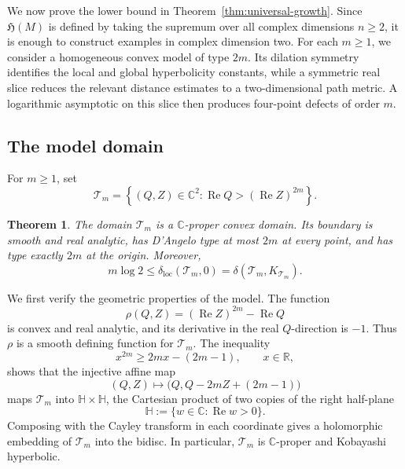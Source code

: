 \documentclass[11pt]{article}
\newtheorem{theorem}{Theorem}[section]
\theoremstyle{definition}
\begin{document}
We now prove the lower bound in Theorem~\ref{thm:universal-growth}. Since
$\mathfrak H(M)$ is defined by taking the supremum over all complex dimensions
$n\geq2$, it is enough to construct examples in complex dimension two. For
each $m\geq1$, we consider a homogeneous convex model of type $2m$. Its
dilation symmetry identifies the local and global hyperbolicity constants,
while a symmetric real slice reduces the relevant distance estimates to a
two-dimensional path metric. A logarithmic asymptotic on this slice then
produces four-point defects of order $m$.

\subsection{The model domain}\label{subsec:lb-final-models}

For $m\geq1$, set
\begin{equation}\label{eq:lb-final-model}
 \mathcal T_m
 =
 \left\{(Q,Z)\in\mathbb C^2:
 \operatorname{Re}Q>(\operatorname{Re}Z)^{2m}\right\}.
\end{equation}

\begin{theorem}\label{thm:lb-final-model}
The domain $\mathcal T_m$ is a $\mathbb C$-proper convex domain. Its boundary
is smooth and real analytic, has D'Angelo type at most $2m$ at every point,
and has type exactly $2m$ at the origin. Moreover,
\begin{equation}\label{eq:lb-final-lower}
 m\log2\leq \delta_{\mathrm{loc}}(\mathcal T_m,0)
 =
 \delta(\mathcal T_m,K_{\mathcal T_m}).
\end{equation}
\end{theorem}

We first verify the geometric properties of the model. The function
\[
 \rho(Q,Z)=(\operatorname{Re}Z)^{2m}-\operatorname{Re}Q
\]
is convex and real analytic, and its derivative in the real $Q$-direction is
$-1$. Thus $\rho$ is a smooth defining function for $\mathcal T_m$. The
inequality
\[
 x^{2m}\geq2mx-(2m-1),
 \qquad x\in\mathbb R,
\]
shows that the injective affine map
\[
 (Q,Z)\longmapsto\bigl(Q,Q-2mZ+(2m-1)\bigr)
\]
maps $\mathcal T_m$ into $\mathbb H\times\mathbb H$, the Cartesian product
of two copies of the right half-plane
\[
 \mathbb H:=\{w\in\mathbb C:\operatorname{Re}w>0\}.
\]
Composing with the Cayley transform in each coordinate gives a holomorphic
embedding of $\mathcal T_m$ into the bidisc. In particular,
$\mathcal T_m$ is $\mathbb C$-proper and Kobayashi hyperbolic.
\end{document}
